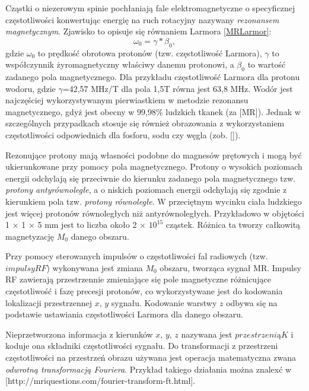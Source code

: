 Cząstki o niezerowym spinie pochłaniają fale elektromagnetyczne o specyficznej częstotliwości konwertując energię na ruch rotacyjny nazywany \textit{rezonansem magnetycznym}. Zjawisko to opisuje się równaniem Larmora \ref{MRLarmor}:
\begin{equation}
\label{MRLarmor}
\omega_0 = \gamma \ast \beta_0,
\end{equation}
gdzie $\omega_0$ to prędkość obrotowa protonów (tzw. częstotliwość Larmora), $\gamma$ to współczynnik żyromagnetyczny właściwy danemu protonowi, a $\beta_0$ to wartość zadanego pola magnetycznego. Dla przykładu częstotliwość Larmora dla protonu wodoru, gdzie $\gamma$=42,57 MHz/T dla pola 1,5T równa jest 63,8 MHz. Wodór jest najczęściej wykorzystywanym pierwiastkiem w metodzie rezonansu magnetycznego, gdyż jest obecny w 99,98\% ludzkich tkanek (za [MR]). Jednak w szczególnych przypadkach stosuje się również obrazowania z wykorzystaniem częstotliwości odpowiednich dla fosforu, sodu czy węgla (zob. []).

Rezonujące protony mają własności podobne do magnesów prętowych i mogą być ukierunkowane przy pomocy pola magnetycznego. Protony o wysokich poziomach energii odchylają się przeciwnie do kierunku zadanego pola magnetycznego tzw. \textit{protony antyrównoległe}, a o niskich poziomach energii odchylają się zgodnie z kierunkiem pola tzw. \textit{protony równoległe}. W przeciętnym wycinku ciała ludzkiego jest więcej protonów równoległych niż antyrównoległych. Przykładowo w objętości 1 $\times$ 1 $\times$ 5 mm jest to liczba około 2 $\times$ $10^15$ cząstek. Różnica ta tworzy całkowitą magnetyzację $M_0$ danego obszaru.

Przy pomocy sterowanych impulsów o częstotliwości fal radiowych (tzw. $impulsy RF$) wykonywana jest zmiana $M_0$ obszaru, tworząca sygnał MR. Impulsy RF zawierają przestrzennie zmieniające się pole magnetyczne różnicujące częstotliwość i fazę precesji protonów, co wykorzystywane jest do kodowania lokalizacji przestrzennej $x$, $y$ sygnału. Kodowanie warstwy $z$ odbywa się na podstawie ustawiania częstotliwości Larmora dla danego obszaru.

Nieprzetworzona informacja z kierunków $x$, $y$, $z$ nazywana jest $przestrzenią K$ i koduje ona składniki częstotliwości sygnału. Do transformacji z przestrzeni częstotliwości na przestrzeń obrazu używana jest operacja matematyczna zwana \textit{odwrotną transformacją Fouriera}. Przykład takiego działania można znalexć w [http://mriquestions.com/fourier-transform-ft.html].

